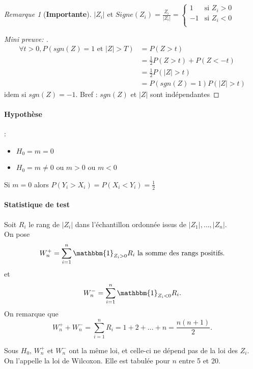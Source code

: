\documentclass{article}
\theoremstyle{plain}%
\theoremstyle{definition}
\theoremstyle{remark}
\newtheorem*{rem}{Remarque}
\begin{document}
\begin{rem}[\textbf{Importante}]
    $ \left| Z_i \right|  $ et $ Signe(Z_i) = \frac{Z_i}{\left| Z_i \right| } = \begin{cases}
    1 &\text{si } Z_i > 0\\
    -1  &\text{si } Z_i < 0\\
    \end{cases} $ 

    \begin{proof}[Mini preuve: ]
        \begin{align*}
            \forall t > 0, P(sgn(Z) = 1 \text{ et } \left| Z \right| > T ) &= P(Z > t) \\ 
            &= \frac{1}{2} P(Z > t) + P(Z < -t) \\
            &= \frac{1}{2} P( \left| Z \right| > t) \\
            &= P(sgn(Z) = 1) P(\left| Z \right| > t)
        \end{align*}
        idem si $ sgn(Z) = -1 $. Bref : $ sgn(Z) $ et $ \left| Z \right|  $ sont indépendantes
    \end{proof}
\end{rem}

\paragraph*{Hypothèse}:
\begin{itemize}
    \item $ H_0 = m = 0$ 
    \item $ H_0 = m \neq 0 $ ou $ m > 0 $ ou $ m < 0 $ 
\end{itemize}
Si $ m=0 $ alors $ P(Y_i > X_i) = P(X_i < Y_i) = \frac{1}{2} $

\paragraph*{Statistique de test} Soit $ R_i $ le rang de $ \left| Z_i \right|  $ dans l'échantillon ordonnée issus de $ \left| Z_1 \right| , \dots, \left| Z_n \right|  $. \\ 
On pose 
\[
    W_n^+ = \sum_{i=1}^{n}\mathbbm{1}_{Z_i > 0}R_i \text{ la somme des rangs positifs}
.\]
et 
\[
    W_n^- = \sum_{i=1}^{n}\mathbbm{1}_{Z_i < 0}R_i
.\]
On remarque que 
\[
    W_n^+ + W_n^- = \sum_{i=1}^{n}R_i = 1 + 2 + \dots + n = \frac{n(n+1)}{2}
.\]

Sous $ H_0 $, $ W_n^+ $ et $ W_n^- $ ont la même loi, et celle-ci ne dépend pas de la loi des $ Z_i $. On l'appelle la loi de Wilcoxon. Elle est tabulée pour $ n $ entre 5 et 20.
\end{document}
